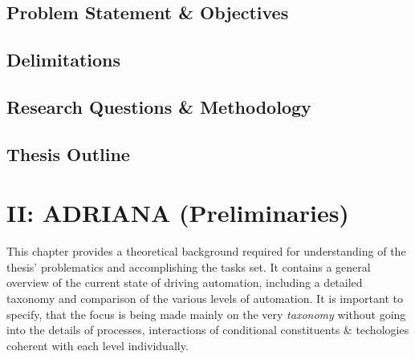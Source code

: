 \section{Problem Statement \& Objectives}

\section{Delimitations}

\section{Research Questions \& Methodology}

\section{Thesis Outline}




\chapter{II: ADRIANA (Preliminaries)}

\begin{chapterabstract}
	\lipsum[1]
\end{chapterabstract}

This chapter provides a theoretical background required for understanding of the thesis' problematics and accomplishing the tasks set.
It contains a general overview of the current state of driving automation, including a detailed taxonomy and comparison of the various levels of automation.
It is important to specify, that the focus is being made mainly on the very \textit{taxonomy} without going into the details of processes, interactions of conditional constituents \& techologies coherent with each level individually.

